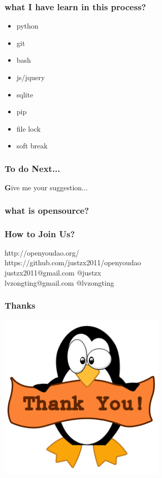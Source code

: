 \documentclass[10pt]{beamer}
\begin{document}
\begin{frame}
  \frametitle{what I have learn in this process?}
\begin{itemize}
  \item python 
  \item git
  \item bash
  \item js/jquery
  \item sqlite
  \item pip
  \item file lock
  \item soft break
\end{itemize}

\end{frame}

\begin{frame}
  \frametitle{To do Next... }
\textbf Give me your suggestion...

\end{frame}

\begin{frame}
  \frametitle{what is opensource?}


\end{frame}

\begin{frame}
  \frametitle{How to Join Us?}

http://openyoudao.org/\\
https://github.com/justzx2011/openyoudao\\
justzx2011@gmail.com  @justzx\\
lvzongting@gmail.com  @lvzongting\\

\end{frame}

\begin{frame}
  \frametitle{Thanks}
\begin{center} 
  \includegraphics[width=0.6\textwidth]{thanks.png}
\end{center}
\end{frame}

\end{document}
